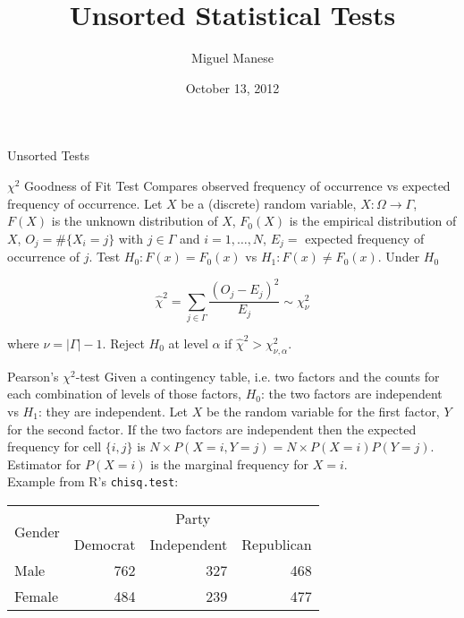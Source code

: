 \documentclass{article}
\title{Unsorted Statistical Tests}
\author{Miguel Manese}
\date{October 13, 2012}
\begin{document}
\maketitle

\begin{section}{Unsorted Tests}
\begin{subsection}{$\chi^2$ Goodness of Fit Test}
Compares observed frequency of occurrence vs expected frequency of occurrence.
Let $X$ be a (discrete) random variable, $X:\Omega \to \Gamma$, $F(X)$ is the
unknown distribution of $X$, $F_0(X)$ is the empirical distribution of $X$,
$O_j = \#\{X_i = j\}$ with $j \in \Gamma$ and $i = 1, \ldots, N$, 
$E_j =$ expected frequency of occurrence of $j$. Test $H_0: F(x) = F_0(x)$ vs
$H_1: F(x) \neq F_0(x)$. Under $H_0$

\[ \hat{\chi}^2 = \sum_{j \in \Gamma} \frac{(O_j - E_j)^2}{E_j} \sim
    \chi^2_\nu \]

\noindent where $\nu = |\Gamma|-1$. Reject $H_0$ at level $\alpha$ if 
$\hat{\chi}^2 > \chi^2_{\nu,\alpha}$.
\end{subsection}

\begin{subsection}{Pearson's $\chi^2$-test}
Given a contingency table, i.e. two factors and the counts for each combination
of levels of those factors, $H_0$: the two factors are independent vs $H_1$:
they are independent. Let $X$ be the random variable for the first factor,
$Y$ for the second factor. If the two factors are independent then the 
expected frequency for cell $\{i,j\}$ is $N \times P(X = i, Y = j) = N \times 
P(X = i) P(Y = j)$. Estimator for $P(X = i)$ is the marginal frequency
for $X = i$.\\

\noindent Example from R's \texttt{chisq.test}:

\begin{table}[h]
\centering
\begin{tabular}{|l|r|r|r|}
\hline
\multirow{2}{*}{Gender} & \multicolumn{3}{|c|}{Party} \\  \cline{2-4}
 & \multicolumn{1}{|c|}{Democrat} &
   \multicolumn{1}{|c|}{Independent} &
   \multicolumn{1}{|c|}{Republican} \\ \hline
Male & 762 & 327 & 468 \\ \hline
Female & 484 & 239 & 477 \\ \hline
\end{tabular}
\end{table}


\end{subsection}
\end{section}
\end{document}
